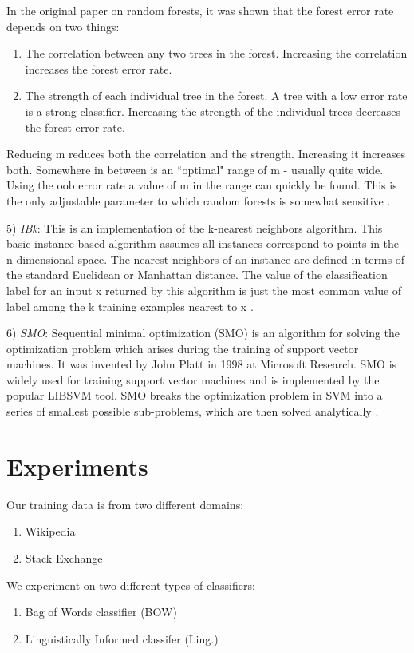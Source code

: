 \documentclass[conference]{IEEEtran}
\begin{document}
In the original paper on random forests, it was shown that the forest error rate depends on two things:

\begin{enumerate}
\item The correlation between any two trees in the forest. Increasing the correlation increases the forest error rate.
\item The strength of each individual tree in the forest. A tree with a low error rate is a strong classifier. Increasing the strength of the individual trees decreases the forest error rate.
\end{enumerate}

Reducing m reduces both the correlation and the strength. Increasing it increases both. Somewhere in between is an ``optimal" range of m - usually quite wide. Using the oob error rate a value of m in the range can quickly be found. This is the only adjustable parameter to which random forests is somewhat sensitive \cite{breiman}.

5) \textit{IBk}: This is an implementation of the k-nearest neighbors algorithm. This basic instance-based algorithm assumes all instances correspond to points in the n-dimensional space. The nearest neighbors of an instance are defined in terms of the standard Euclidean or Manhattan distance. The value of the classification label for an input x returned by this algorithm is just the most common value of label among the k training examples nearest to x \cite{Mitchell}.

6) \textit{SMO}: Sequential minimal optimization (SMO) is an algorithm for solving the optimization problem which arises during the training of support vector machines. It was invented by John Platt in 1998 at Microsoft Research. SMO is widely used for training support vector machines and is implemented by the popular LIBSVM tool. SMO breaks the optimization problem in SVM into a series of smallest possible sub-problems, which are then solved analytically \cite{smo}.

\section{Experiments}
Our training data is from two different domains:
\begin{enumerate}
\item Wikipedia
\item Stack Exchange
\end{enumerate}

We experiment on two different types of classifiers: 
\begin{enumerate}
\item Bag of Words classifier (BOW)
\item Linguistically Informed classifer (Ling.)
\end{enumerate}
\end{document}
